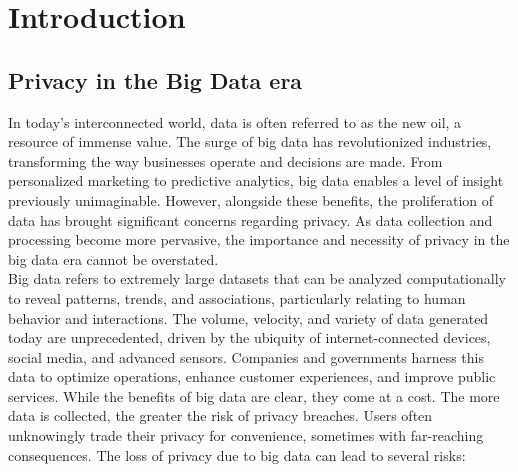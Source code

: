 \chapter{Introduction}
\label{ch:Introduction}

\section{Privacy in the Big Data era}

In today's interconnected world, data is often referred to as the new oil, a resource of immense value. The surge of big data has revolutionized industries, transforming the way businesses operate and decisions are made. From personalized marketing to predictive analytics, big data enables a level of insight previously unimaginable. However, alongside these benefits, the proliferation of data has brought significant concerns regarding privacy. As data collection and processing become more pervasive, the importance and necessity of privacy in the big data era cannot be overstated.\\
Big data refers to extremely large datasets that can be analyzed computationally to reveal patterns, trends, and associations, particularly relating to human behavior and interactions. The volume, velocity, and variety of data generated today are unprecedented, driven by the ubiquity of internet-connected devices, social media, and advanced sensors. Companies and governments harness this data to optimize operations, enhance customer experiences, and improve public services. While the benefits of big data are clear, they come at a cost. The more data is collected, the greater the risk of privacy breaches. Users often unknowingly trade their privacy for convenience, sometimes with far-reaching consequences.
The loss of privacy due to big data can lead to several risks:


